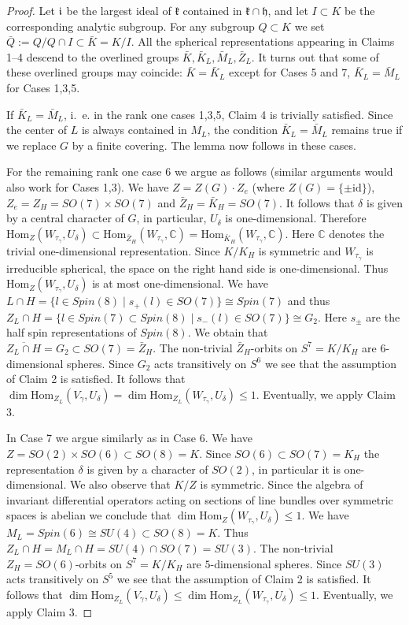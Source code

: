 \documentclass[10]{amsart}
\theoremstyle{remark}
\theoremstyle{definition}
\numberwithin{equation}{section}
\newcommand{\C}{\mathbb{C}}           %
\newcommand{\Hom}{\mathrm{Hom}}
\newcommand{\id}{\mathrm{id}}
\newcommand{\fh}{{\mathfrak h}}
\newcommand{\fk}{{\mathfrak k}}
\begin{document}
{\begin{proof}
Let $\frak i$ be the largest ideal of $\fk$ contained in $\fk\cap\fh$, and let $I\subset K$ be the corresponding analytic subgroup. For any subgroup $Q\subset K$ we set
$\bar Q:=Q/Q\cap I\subset \bar K=K/I$. All the spherical representations appearing in Claims 1--4 descend to the overlined groups $\bar K, \bar K_L, \bar M_L, \bar Z_L$.
It turns out that some of these overlined groups may coincide: $\bar K=\bar K_L$ except for Cases 5 and 7, $\bar K_L=\bar M_L$ for Cases 1,3,5.

If $\bar K_L=\bar M_L$, i.~e. in the rank one cases 1,3,5, Claim 4 is trivially satisfied. Since the center of $L$ is always contained in $M_L$, the condition $\bar K_L=\bar M_L$
remains true if we replace $G$ by a finite covering. The lemma now follows in these cases. 

For the remaining  rank one case 6 we argue as follows (similar arguments would also work for
Cases 1,3). We have $Z=Z(G)\cdot Z_e$ (where $Z(G)=\{\pm\id\}$), $Z_e=Z_H=SO(7)\times SO(7)$ and $\bar Z_H=\bar K_H=SO(7)$. It follows that $\delta$ is given by a central character of $G$, in particular, $U_\delta$ is one-dimensional. Therefore $\Hom_Z(W_{\tau_\gamma}, U_\delta)\subset \Hom_{\bar Z_H}(W_{\tau_\gamma}, \C)=\Hom_{\bar K_H}(W_{\tau_\gamma}, \C)$.
Here $\C$ denotes the trivial one-dimensional representation. Since $K/K_H$ is symmetric and $W_{\tau_\gamma}$ is  irreducible spherical, the space on the right hand side is one-dimensional. Thus $\Hom_Z(W_{\tau_\gamma}, U_\delta)$ is at most one-dimensional. We have $L\cap H=\{l\in Spin(8)\mid s_+(l)\in SO(7)\}\cong Spin(7)$ and thus
$Z_L\cap H=\{l\in Spin(7)\subset Spin(8)\mid s_-(l)\in SO(7)\}\cong G_2$. Here $s_\pm$ are the half spin representations of $Spin(8)$. We obtain that $\overline{Z_L\cap H}=G_2\subset SO(7)=\bar Z_H$. The non-trivial $\bar Z_H$-orbits on $S^7=K/K_H$ are $6$-dimensional spheres. Since $G_2$ acts transitively on $S^6$ we see that the assumption of Claim 2
is satisfied. It follows that $\dim \Hom_{Z_L}(V_\gamma,U_\delta)=\dim \Hom_{Z_L}(W_{\tau_\gamma}, U_\delta)\le 1$. Eventually, we apply Claim 3.  

In Case 7 we argue similarly as in Case 6. 
We have $Z=SO(2)\times SO(6)\subset SO(8)=K$. Since $SO(6)\subset SO(7)=K_H$ the representation $\delta$ is given by a character of $SO(2)$, in particular it is one-dimensional. We also observe that $K/Z$ is symmetric. Since the algebra
of invariant differential operators acting on sections of line bundles over symmetric spaces is abelian we conclude that $\dim\Hom_Z(W_{\tau_\gamma}, U_\delta)\le 1$.
We have $M_L=Spin(6)\cong SU(4)\subset SO(8)=K$. Thus $Z_L\cap H=M_L\cap H=SU(4)\cap SO(7)=SU(3)$. The non-trivial $Z_H=SO(6)$-orbits on $S^7=K/K_H$ are $5$-dimensional spheres. Since $SU(3)$ acts transitively on $S^5$ we see that the assumption of Claim 2
is satisfied. It follows that $\dim \Hom_{Z_L}(V_\gamma,U_\delta)\le\dim \Hom_{Z_L}(W_{\tau_\gamma}, U_\delta)\le 1$. Eventually, we apply Claim 3. 


\end{proof}}
\end{document}
